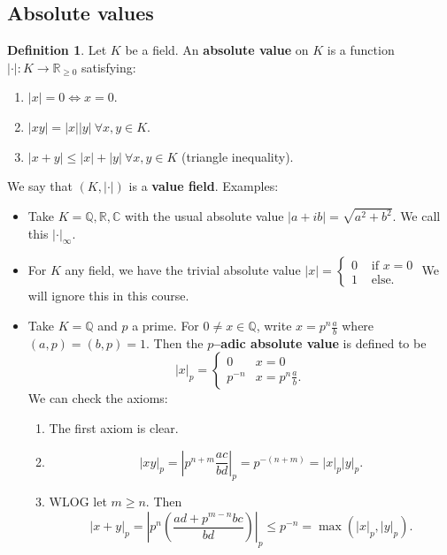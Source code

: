 \documentclass{article}
\theoremstyle{definition}
\newtheorem{defn}{Definition}[section]
\begin{document}
\subsection{Absolute values}
\begin{defn}
    Let $K$ be a field. An \textbf{absolute value} on $K$ is a function $|\cdot| : K \to \mathbb{R}_{\ge 0}$ satisfying:
    \begin{enumerate}[(1)]
        \item $|x| = 0 \iff x = 0$.
        \item $|xy| = |x||y| ~\forall x,y \in K$.
        \item $|x+y|\le |x|+|y| ~\forall x,y \in K$ (triangle inequality).
    \end{enumerate}
\end{defn}
We say that $(K, |\cdot|)$ is a \textbf{value field}.
Examples:
\begin{itemize}
    \item Take $K=\mathbb{Q},\mathbb{R},\mathbb{C}$ with the usual absolute value $|a+ib| = \sqrt{a^2+b^2}$. We call this $|\cdot |_{\infty}$.
    \item For $K$ any field, we have the trivial absolute value $|x| = \begin{cases}
        0 & \text{ if } x = 0\\
        1 & \text{ else.}
    \end{cases}$
    We will ignore this in this course.
    \item Take $K= \mathbb{Q}$ and $p$ a prime. For $0 \neq x \in \mathbb{Q}$, write $x = p^n \frac{a}{b}$ where $(a,p)=(b,p)=1$. Then the \textbf{$p$--adic absolute value} is defined to be \[
    |x|_p = \begin{cases}
        0 & x=0\\
        p^{-n} & x = p^n\frac{a}{b}.
    \end{cases}
    \] 
    We can check the axioms:
    \begin{enumerate}[(1)]
        \item The first axiom is clear.
        \item $$|xy|_p = \left|p^{n+m}\frac{ac}{bd}\right|_p = p^{-(n+m)} = |x|_p|y|_p.$$
        \item WLOG let $m\ge n$. Then \[
        |x+y|_p = \left|p^n\left(\frac{ad+p^{m-n}bc}{bd}\right)\right|_p \le p^{-n} = \max(|x|_p, |y|_p).
        \]
    \end{enumerate}
\end{itemize}
\end{document}
